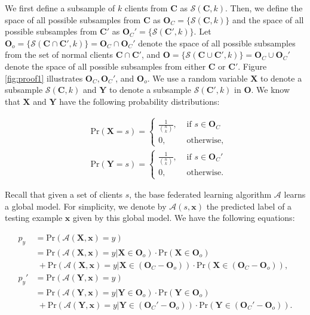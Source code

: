 \documentclass[letterpaper]{article} %
\begin{document}
We first define a subsample of $k$ clients from $\mathbf{C}$ as $\mathcal{S}(\mathbf{C}, k)$. Then, we define the space of all possible subsamples from $\mathbf{C}$ as $\mathbf{O}_C=\{\mathcal{S}(\mathbf{C}, k)\}$ and the space of all possible subsamples from $\mathbf{C}'$ as $\mathbf{O}_C'=\{\mathcal{S}(\mathbf{C}', k)\}$. Let $\mathbf{O}_o=\{\mathcal{S}(\mathbf{C}\cap\mathbf{C}', k)\}=\mathbf{O}_C\cap\mathbf{O}_C'$ denote the space of all possible subsamples from the set of normal clients $\mathbf{C}\cap\mathbf{C}'$, and $\mathbf{O} = \{\mathcal{S}(\mathbf{C}\cup\mathbf{C}', k)\} = \mathbf{O}_C\cup\mathbf{O}_C'$ denote the space of all possible subsamples from either $\mathbf{C}$ or $\mathbf{C}'$. Figure \ref{fig:proof1} illustrates $\mathbf{O}_C, \mathbf{O}_C'$, and $\mathbf{O}_o$. We use a random variable $\mathbf{X}$ to denote a subsample $\mathcal{S}(\mathbf{C}, k)$ and $\mathbf{Y}$ to denote a subsample $\mathcal{S}(\mathbf{C}', k)$ in $\mathbf{O}$. We know that $\mathbf{X}$ and $\mathbf{Y}$ have the following probability distributions:

\begin{align}
	&\text{Pr}(\mathbf{X}=s) = 
		\begin{cases}
 			\frac{1}{{n \choose k}}, &\text{ if } s \in \mathbf{O}_C\\
			0, 					   &\text{ otherwise},
		\end{cases}\\
	&\text{Pr}(\mathbf{Y}=s) = 
		\begin{cases}
 			\frac{1}{{n \choose k}}, &\text{ if } s \in \mathbf{O}_C'\\
			0, 					   &\text{ otherwise}.
		\end{cases}
\end{align}

Recall that given a set of clients $s$, the base federated learning algorithm $\mathcal{A}$ learns a global model. For simplicity, we denote by $\mathcal{A}(s,\mathbf{x})$ the predicted label of a testing example $\mathbf{x}$ given by this global model. 
We have the following equations:

\begin{align}
	p_y &= \text{Pr}(\mathcal{A}(\mathbf{X},\mathbf{x})=y)\\
		&= \text{Pr}(\mathcal{A}(\mathbf{X},\mathbf{x})=y|\mathbf{X}\in\mathbf{O}_o) \cdot \text{Pr}(\mathbf{X}\in\mathbf{O}_o) \nonumber\\\label{eq:subtract1}
		&\;+  \text{Pr}(\mathcal{A}(\mathbf{X},\mathbf{x})=y|\mathbf{X}\in(\mathbf{O}_C-\mathbf{O}_o)) \cdot \text{Pr}(\mathbf{X}\in(\mathbf{O}_C-\mathbf{O}_o)),\\
	p_y' &= \text{Pr}(\mathcal{A}(\mathbf{Y},\mathbf{x})=y)\\\label{eq:subtract2}
		&= \text{Pr}(\mathcal{A}(\mathbf{Y},\mathbf{x})=y|\mathbf{Y}\in\mathbf{O}_o) \cdot \text{Pr}(\mathbf{Y}\in\mathbf{O}_o) \nonumber\\
		&\;+  \text{Pr}(\mathcal{A}(\mathbf{Y},\mathbf{x})=y|\mathbf{Y}\in(\mathbf{O}_C'-\mathbf{O}_o)) \cdot \text{Pr}(\mathbf{Y}\in(\mathbf{O}_C'-\mathbf{O}_o)).
\end{align}
\end{document}
